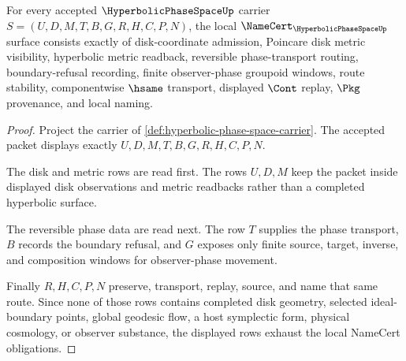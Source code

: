 \begin{theorem}
\label{thm:hyperbolic-phase-space-namecert-obligations}
For every accepted $\HyperbolicPhaseSpaceUp$ carrier $S=(U,D,M,T,B,G,R,H,C,P,N)$, the local $\NameCert_{\HyperbolicPhaseSpaceUp}$ surface consists exactly of disk-coordinate admission, Poincare disk metric visibility, hyperbolic metric readback, reversible phase-transport routing, boundary-refusal recording, finite observer-phase groupoid windows, route stability, componentwise $\hsame$ transport, displayed $\Cont$ replay, $\Pkg$ provenance, and local naming.
\end{theorem}
\begin{proof}
Project the carrier of \autoref{def:hyperbolic-phase-space-carrier}. The accepted packet displays exactly $U,D,M,T,B,G,R,H,C,P,N$.

The disk and metric rows are read first. The rows $U,D,M$ keep the packet inside displayed disk observations and metric readbacks rather than a completed hyperbolic surface.

The reversible phase data are read next. The row $T$ supplies the phase transport, $B$ records the boundary refusal, and $G$ exposes only finite source, target, inverse, and composition windows for observer-phase movement.

Finally $R,H,C,P,N$ preserve, transport, replay, source, and name that same route. Since none of those rows contains completed disk geometry, selected ideal-boundary points, global geodesic flow, a host symplectic form, physical cosmology, or observer substance, the displayed rows exhaust the local NameCert obligations.
\end{proof}

